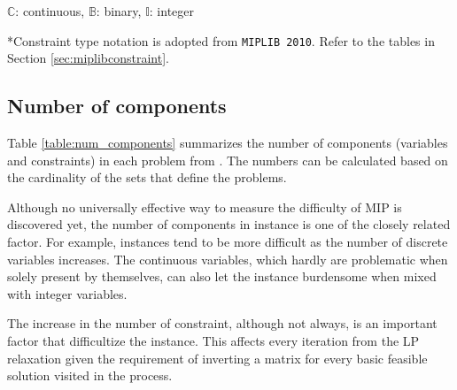 \begin{table}[H]
\begin{threeparttable}
		\begin{tablenotes}
			\small
			\item *$\mathbb{C}$: continuous, $\mathbb{B}$: binary, $\mathbb{I}$: integer
			\item **Constraint type notation is adopted from \texttt{MIPLIB 2010}. Refer to the tables in Section \ref{sec:miplibconstraint}.
		\end{tablenotes}
	\end{threeparttable}
\end{table}

\subsection{Number of components}
Table \ref{table:num_components} summarizes the number of components (variables and constraints) in each problem from \siplibtwo. The numbers can be calculated based on the cardinality of the sets that define the problems.

Although no universally effective way to measure the difficulty of MIP is discovered yet, the number of components in instance is one of the closely related factor. For example, instances tend to be more difficult as the number of discrete variables increases. The continuous variables, which hardly are problematic when solely present by themselves, can also let the instance burdensome when mixed with integer variables. 

The increase in the number of constraint, although not always, is an important factor that difficultize the instance. This affects every iteration from the LP relaxation given the requirement of inverting a matrix for every basic feasible solution visited in the process.

